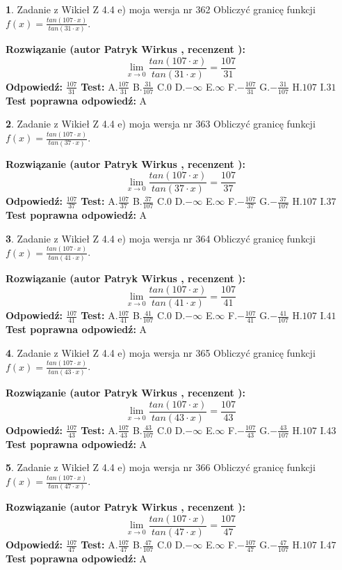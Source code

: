 \documentclass[12pt, a4paper]{article}
\theoremstyle{definition} %
\newtheorem{zad}{}
\newcommand{\zadStart}[1]{\begin{zad}#1\newline}
\newcommand{\zadStop}{\end{zad}}
\newcommand{\rozwStart}[2]{\noindent \textbf{Rozwiązanie (autor #1 , recenzent #2): }\newline}
\newcommand{\rozwStop}{\newline}
\newcommand{\odpStart}{\noindent \textbf{Odpowiedź:}\newline}
\newcommand{\odpStop}{\newline}
\newcommand{\testStart}{\noindent \textbf{Test:}\newline}
\newcommand{\testStop}{\newline}
\newcommand{\kluczStart}{\noindent \textbf{Test poprawna odpowiedź:}\newline}
\newcommand{\kluczStop}{\newline}
\begin{document}
\zadStart{Zadanie z Wikieł Z 4.4 e) moja wersja nr 362}
Obliczyć granicę funkcji $f(x)=\frac{tan(107\cdot x)}{tan(31\cdot x)}$.
\zadStop
\rozwStart{Patryk Wirkus}{}
$$\lim\limits_{x\to 0}\frac{tan(107\cdot x)}{tan(31\cdot x)}=
\frac{107}{31}$$
\rozwStop
\odpStart
$\frac{107}{31}$
\odpStop
\testStart
A.$\frac{107}{31}$
B.$\frac{31}{107}$
C.$0$
D.$-\infty$
E.$\infty$
F.$-\frac{107}{31}$
G.$-\frac{31}{107}$
H.$107$
I.$31$
\testStop
\kluczStart
A
\kluczStop



\zadStart{Zadanie z Wikieł Z 4.4 e) moja wersja nr 363}
Obliczyć granicę funkcji $f(x)=\frac{tan(107\cdot x)}{tan(37\cdot x)}$.
\zadStop
\rozwStart{Patryk Wirkus}{}
$$\lim\limits_{x\to 0}\frac{tan(107\cdot x)}{tan(37\cdot x)}=
\frac{107}{37}$$
\rozwStop
\odpStart
$\frac{107}{37}$
\odpStop
\testStart
A.$\frac{107}{37}$
B.$\frac{37}{107}$
C.$0$
D.$-\infty$
E.$\infty$
F.$-\frac{107}{37}$
G.$-\frac{37}{107}$
H.$107$
I.$37$
\testStop
\kluczStart
A
\kluczStop



\zadStart{Zadanie z Wikieł Z 4.4 e) moja wersja nr 364}
Obliczyć granicę funkcji $f(x)=\frac{tan(107\cdot x)}{tan(41\cdot x)}$.
\zadStop
\rozwStart{Patryk Wirkus}{}
$$\lim\limits_{x\to 0}\frac{tan(107\cdot x)}{tan(41\cdot x)}=
\frac{107}{41}$$
\rozwStop
\odpStart
$\frac{107}{41}$
\odpStop
\testStart
A.$\frac{107}{41}$
B.$\frac{41}{107}$
C.$0$
D.$-\infty$
E.$\infty$
F.$-\frac{107}{41}$
G.$-\frac{41}{107}$
H.$107$
I.$41$
\testStop
\kluczStart
A
\kluczStop



\zadStart{Zadanie z Wikieł Z 4.4 e) moja wersja nr 365}
Obliczyć granicę funkcji $f(x)=\frac{tan(107\cdot x)}{tan(43\cdot x)}$.
\zadStop
\rozwStart{Patryk Wirkus}{}
$$\lim\limits_{x\to 0}\frac{tan(107\cdot x)}{tan(43\cdot x)}=
\frac{107}{43}$$
\rozwStop
\odpStart
$\frac{107}{43}$
\odpStop
\testStart
A.$\frac{107}{43}$
B.$\frac{43}{107}$
C.$0$
D.$-\infty$
E.$\infty$
F.$-\frac{107}{43}$
G.$-\frac{43}{107}$
H.$107$
I.$43$
\testStop
\kluczStart
A
\kluczStop



\zadStart{Zadanie z Wikieł Z 4.4 e) moja wersja nr 366}
Obliczyć granicę funkcji $f(x)=\frac{tan(107\cdot x)}{tan(47\cdot x)}$.
\zadStop
\rozwStart{Patryk Wirkus}{}
$$\lim\limits_{x\to 0}\frac{tan(107\cdot x)}{tan(47\cdot x)}=
\frac{107}{47}$$
\rozwStop
\odpStart
$\frac{107}{47}$
\odpStop
\testStart
A.$\frac{107}{47}$
B.$\frac{47}{107}$
C.$0$
D.$-\infty$
E.$\infty$
F.$-\frac{107}{47}$
G.$-\frac{47}{107}$
H.$107$
I.$47$
\testStop
\kluczStart
A
\kluczStop
\end{document}
